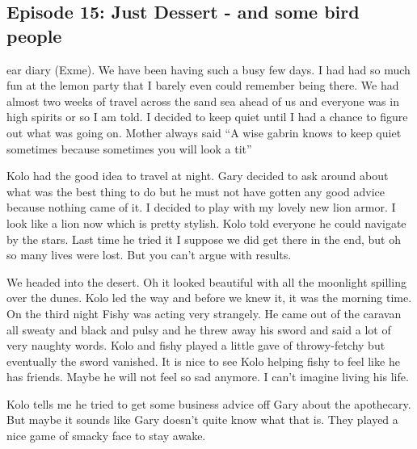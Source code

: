 \subsection{Episode 15: Just Dessert - and some bird people}
ear diary (Exme). We have been having such a busy few days. I had had so much fun at the lemon party that I barely even could remember being there. We had almost two weeks of travel across the sand sea ahead of us and everyone was in high spirits or so I am told. I decided to keep quiet until I had a chance to figure out what was going on. Mother always said “A wise gabrin knows to keep quiet sometimes because sometimes you will look a tit”\medskip

Kolo had the good idea to travel at night. Gary decided to ask around about what was the best thing to do but he must not have gotten any good advice because nothing came of it. I decided to play with my lovely new lion armor. I look like a lion now which is pretty stylish. Kolo told everyone he could navigate by the stars. Last time he tried it I suppose we did get there in the end, but oh so many lives were lost. But you can’t argue with results.\medskip

We headed into the desert. Oh it looked beautiful with all the moonlight spilling over the dunes. Kolo led the way and before we knew it, it was the morning time. On the third night Fishy was acting very strangely. He came out of the caravan all sweaty and black and pulsy and he threw away his sword and said a lot of very naughty words. Kolo and fishy played a little gave of throwy-fetchy but eventually the sword vanished. It is nice to see Kolo helping fishy to feel like he has friends. Maybe he will not feel so sad anymore. I can’t imagine living his life.\medskip

Kolo tells me he tried to get some business advice off Gary about the apothecary. But maybe it sounds like Gary doesn’t quite know what that is. They played a nice game of smacky face to stay awake.\medskip


